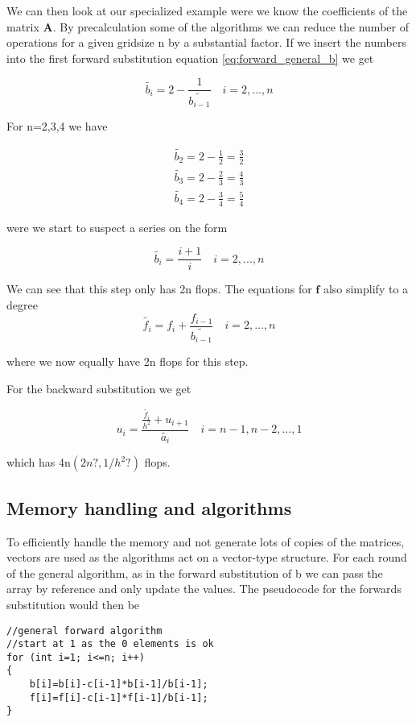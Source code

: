 \documentclass[a4paper,11pt]{article}
\begin{document}
{We can then look at our specialized example were we know the coefficients of the matrix $\mathbf{A}$. By precalculation some of the algorithms we can reduce the number of operations for a given gridsize n by a substantial factor. If we insert the numbers into the first forward substitution equation \ref{eq:forward_general_b} we get

\begin{equation}
	\tilde{b_i}=2-\frac{1}{\tilde{b_{i-1}}}\quad i = 2, ..., n
\end{equation}

For n=2,3,4 we have 

\begin{align}
	\tilde{b_2}=2-\frac{1}{2}=\frac{3}{2} \\
	\tilde{b_3}=2-\frac{2}{3}=\frac{4}{3} \\
	\tilde{b_4}=2-\frac{3}{4}=\frac{5}{4}
\end{align}

were we start to suspect a series on the form

\begin{equation}
	\tilde{b_i}=\frac{i+1}{i}  \quad i = 2, ..., n
	\label{eq:forward_specific_b}
\end{equation}

We can see that this step only has 2n flops. The equations for $\mathbf{f}$ also simplify to a degree
\begin{equation}
	\tilde{f_i}=f_{i}+\frac{f_{i-1}}{\tilde{b_{i-1}}}\quad i = 2, ..., n
	\label{eq:forward_specific_f}
\end{equation}

where we now equally have 2n flops for this step. 

For the backward substitution we get 

\begin{equation}
	u_i = \frac{\frac{\tilde{f_i}}{h^2}+ u_{i+1}}{\tilde{a_i}}\quad i = n-1, n-2, ..., 1
	\label{eq:forward_specific_u}
\end{equation}

which has 4n$(2n?, 1/h^2 ?)$ flops. 

\subsection{Memory handling and algorithms}
To efficiently handle the memory and not generate lots of copies of the matrices, vectors are used as the algorithms act on a vector-type structure. For each round of the general algorithm, as in the forward substitution of b we can pass the array by reference and only update the values. The pseudocode for the forwards substitution would then be
\begin{lstlisting}
//general forward algorithm
//start at 1 as the 0 elements is ok
for (int i=1; i<=n; i++)
{
	b[i]=b[i]-c[i-1]*b[i-1]/b[i-1];
	f[i]=f[i]-c[i-1]*f[i-1]/b[i-1];
}
\end{lstlisting}


}
\end{document}
